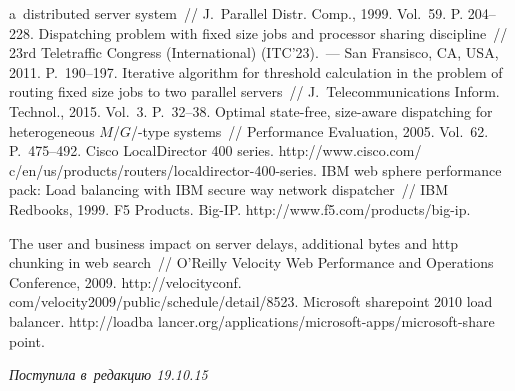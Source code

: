 \begin{multicols}{2}
{{\begin{thebibliography}{99}
a~distributed server system~// J.~Parallel Distr. Comp., 1999. Vol.~59. P. 204--228.
     Dispatching problem 
with fixed size jobs and processor sharing discipline~// 23rd Teletraffic Congress (International) 
(ITC'23).~--- San Fransisco, CA, USA, 2011. P.~190--197.
     Iterative algorithm for threshold calculation in the 
problem of routing fixed size jobs to two parallel servers~// J.~Telecommunications Inform. 
Technol., 2015. Vol.~3. P.~32--38.
     Optimal state-free, size-aware dispatching for 
heterogeneous $M$/$G$/-type systems~// Performance Evaluation, 2005. Vol.~62. P.~475--492.
    Cisco LocalDirector 400 series. {\sf 
    http://www.cisco.com/ c/en/us/products/routers/localdirector-400-series}.
     IBM web sphere performance pack: Load balancing with IBM 
secure way network dispatcher~// IBM Redbooks, 1999.
    F5 Products. Big-IP. {\sf http://www.f5.com/products/big-ip}.
    
     The user and business impact on server delays, additional 
bytes and http chunking in web search~// O'Reilly Velocity Web Performance and 
Operations Conference, 2009. {\sf http://velocityconf. com/velocity2009/public/schedule/detail/8523}.
    Microsoft sharepoint 2010 load balancer. 
    {\sf http://loadba lancer.org/applications/microsoft-apps/microsoft-share point}. 
 \end{thebibliography}

 }
 }

\end{multicols}

\vspace*{-3pt}

\hfill{\small\textit{Поступила в~редакцию 19.10.15}}


\newpage





\vspace*{-24pt}


